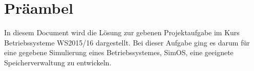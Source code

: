 \section{Präambel}
In diesem Document wird die Lösung zur gebenen Projektaufgabe im Kurs Betriebssysteme WS2015/16 dargestellt.
Bei dieser Aufgabe ging es darum für eine gegebene Simulierung eines Betriebssystemes, SimOS, eine geeignete Speicherverwaltung zu entwickeln. 